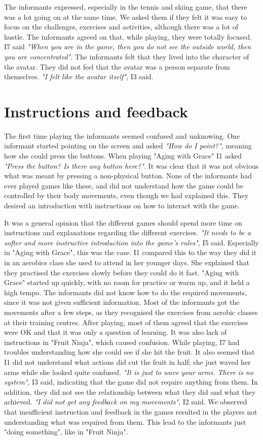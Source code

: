 The informants expressed, especially in the tennis and skiing game, that there was a lot going on at the same time. We asked them if they felt it was easy to focus on the challenges, exercises and activities, although there was a lot of hustle. The informants agreed on that, while playing, they were totally focused. I7 said \emph{"When you are in the game, then you do not see the outside world, then you are concentrated"}. The informants felt that they lived into the character of the avatar. They did not feel that the avatar was a person separate from themselves. \emph{"I felt like the avatar itself"}, I3 said. 

\section{Instructions and feedback}
The first time playing the informants seemed confused and unknowing. One informant started pointing on the screen and asked \emph{"How do I point?"}, meaning how she could press the buttons. When playing "Aging with Grace" I1 asked \emph{"Press the button? Is there any button here?"}. It was clear that it was not obvious what was meant by pressing a non-physical button. None of the informants had ever played games like these, and did not understand how the game could be controlled by their body movements, even though we had explained this. They desired an introduction with instructions on how to interact with the game.

It was a general opinion that the different games should spend more time on instructions and explanations regarding the different exercises. \emph{"It needs to be a softer and more instructive introduction into the game's rules"}, I5 said. Especially in "Aging with Grace", this was the case. I1 compared this to the way they did it in an aerobics class she used to attend in her younger days. She explained that they practised the exercises slowly before they could do it fast. "Aging with Grace" started up quickly, with no room for practice or warm up, and it held a high tempo. The informants did not know how to do the required movements, since it was not given sufficient information. Most of the informants got the movements after a few steps, as they recognised the exercises from aerobic classes at their training centres. After playing, most of them agreed that the exercises were OK and that it was only a question of learning. It was also lack of instructions in "Fruit Ninja", which caused confusion. While playing, I7 had troubles understanding how she could see if she hit the fruit. It also seemed that I1 did not understand what actions did cut the fruit in half; she just waved her arms while she looked quite confused. \emph{"It is just to wave your arms. There is no system"}, I3 said, indicating that the game did not require anything from them. In addition, they did not see the relationship between what they did and what they achieved. \emph{"I did not get any feedback on my movements"}, I2 said. We observed that insufficient instruction and feedback in the games resulted in the players not understanding what was required from them. This lead to the informants just "doing something", like in "Fruit Ninja". 

